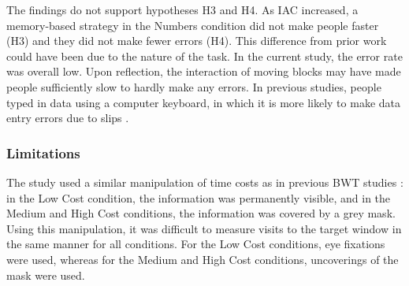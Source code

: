 The findings do not support hypotheses H3 and H4. As IAC increased, a memory-based strategy in the Numbers condition did not make people faster (H3) and they did not make fewer errors (H4). This difference from prior work \citep{Gray2004, Soboczenski2013} could have been due to the nature of the task. In the current study, the error rate was overall low. Upon reflection, the interaction of moving blocks may have made people sufficiently slow to hardly make any errors. In previous studies, people typed in data using a computer keyboard, in which it is more likely to make data entry errors due to slips \citep{Oladimeji2011}.

 
 \subsubsection{Limitations}
The study used a similar manipulation of time costs as in previous BWT studies \citep[e.g.][]{Morgan2009, Patrick2014, Waldron2007, Waldron2011}: in the Low Cost condition, the information was permanently visible, and in the Medium and High Cost conditions, the information was covered by a grey mask. Using this manipulation, it was difficult to measure visits to the target window in the same manner for all conditions. For the Low Cost conditions, eye fixations were used, whereas for the Medium and High Cost conditions, uncoverings of the mask were used. 

